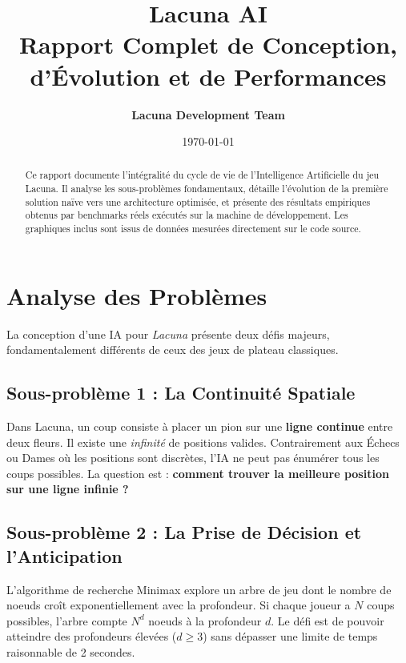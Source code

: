 \documentclass[12pt, a4paper]{article}
\title{
    \vspace{-1.5cm}
    \Huge\textbf{\textcolor{primary}{Lacuna AI}} \\
    \vspace{0.5cm}
    \Large \textbf{Rapport Complet de Conception, d'Évolution et de Performances}
}
\author{\textbf{Lacuna Development Team}}
\date{\today}
\begin{document}
\maketitle
\thispagestyle{empty}

\begin{abstract}
\noindent Ce rapport documente l'intégralité du cycle de vie de l'Intelligence Artificielle du jeu Lacuna. Il analyse les sous-problèmes fondamentaux, détaille l'évolution de la première solution naïve vers une architecture optimisée, et présente des résultats empiriques obtenus par benchmarks réels exécutés sur la machine de développement. Les graphiques inclus sont issus de données mesurées directement sur le code source.
\end{abstract}

\tableofcontents
\newpage

\section{Analyse des Problèmes}

La conception d'une IA pour \textit{Lacuna} présente deux défis majeurs, fondamentalement différents de ceux des jeux de plateau classiques.

\subsection{Sous-problème 1 : La Continuité Spatiale}
\begin{problembox}
Dans Lacuna, un coup consiste à placer un pion sur une \textbf{ligne continue} entre deux fleurs. Il existe une \textit{infinité} de positions valides. Contrairement aux Échecs ou Dames où les positions sont discrètes, l'IA ne peut pas énumérer tous les coups possibles. La question est : \textbf{comment trouver la meilleure position sur une ligne infinie ?}
\end{problembox}

\subsection{Sous-problème 2 : La Prise de Décision et l'Anticipation}
\begin{problembox}
L'algorithme de recherche Minimax explore un arbre de jeu dont le nombre de noeuds croît exponentiellement avec la profondeur. Si chaque joueur a $N$ coups possibles, l'arbre compte $N^d$ noeuds à la profondeur $d$. Le défi est de pouvoir atteindre des profondeurs élevées ($d \geq 3$) sans dépasser une limite de temps raisonnable de 2 secondes.
\end{problembox}
\end{document}
